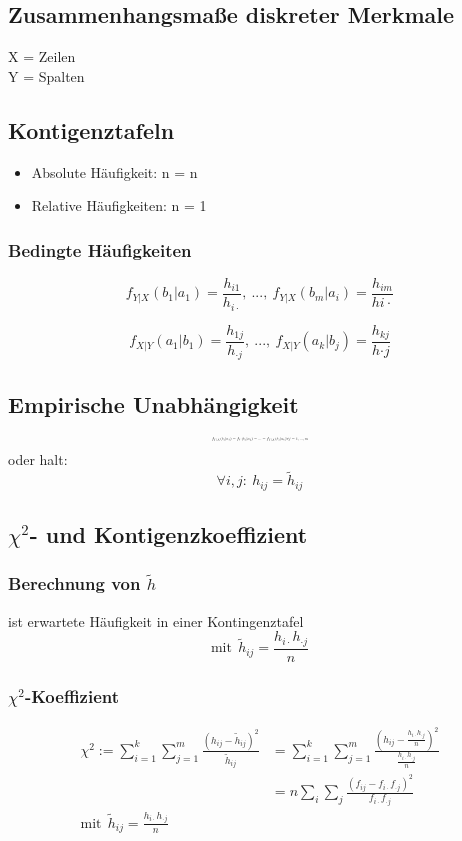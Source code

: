\documentclass[10pt,a4paper,landscape]{article}
\begin{document}
\begin{multicols}{4}
\section{Zusammenhangsmaße diskreter Merkmale}
X = Zeilen \\
Y = Spalten
\subsection{Kontigenztafeln}
\begin{itemize}
\item Absolute Häufigkeit: n = n
\item Relative Häufigkeiten: n = 1
\end{itemize}

\subsubsection*{Bedingte Häufigkeiten}

\[
f_{Y|X}(b_1|a_1)=\frac{h_{i1}}{h_{i\cdot}},~...,~ f_{Y|X}(b_m|a_i)=\frac{h_{im}}{h{i\cdot}}
\]

\[
f_{X|Y}(a_1|b_1)=\frac{h_{1j}}{h_{\cdot j}},~...,~ f_{X|Y}(a_k|b_j)=\frac{h_{kj}}{h{\cdot j}}
\]

\subsection{Empirische Unabhängigkeit}
\[ \resizebox{0.2\textwidth}{!}{$
f_{Y|X}(b_j|a_1)=f_Y(b_j|a_2)=...=f_{Y|X}(b_j|a_k)\forall j=1,...,m
$}
\]
oder halt:
\[
\forall i,j: ~ h_{ij}=\tilde{h}_{ij}
\]

\subsection{$\chi^2$- und Kontigenzkoeffizient}

\subsubsection*{Berechnung von $\tilde{h}$}
ist erwartete Häufigkeit in einer Kontingenztafel
\[
\text{mit}~~ \tilde{h}_{ij}=\frac{h_{i\cdot}h_{\cdot j}}{n}
\]

\subsubsection*{$\chi^2$-Koeffizient}

{\tiny
\begin{align*}
\chi^2 := \sum_{i=1}^k \sum_{j=1}^m \frac{(h_{ij}-\tilde{h}_{ij})^2}{\tilde{h}_{ij}}&=\sum_{i=1}^k \sum_{j=1}^m \frac{(h_{ij}-\frac{h_{i\cdot}h_{\cdot j}}{n})^2}{\frac{h_{i\cdot}h_{\cdot j}}{n}} \\
&=  n\sum_{i} \sum_{j}\frac{(f_{ij}-f_{i\cdot}f_{\cdot j})^2}{f_{i\cdot}f_{\cdot j}} \\
\text{mit}~~ \tilde{h}_{ij}=\frac{h_{i\cdot}h_{\cdot j}}{n}
\end{align*}
}


\end{multicols}
\end{document}
